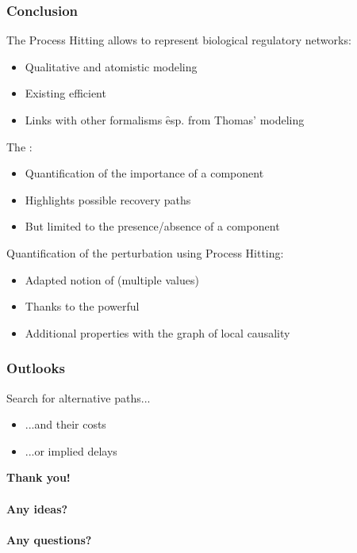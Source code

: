 
\begin{frame}[c]
  \frametitle{Conclusion}

The Process Hitting allows to represent biological regulatory networks:
\begin{itemize}
  \item Qualitative and atomistic modeling
  \item Existing efficient 
  \item Links with other formalisms \f esp. from Thomas' modeling
\end{itemize}

\medskip
The :
\begin{itemize}
  \item Quantification of the importance of a component
  \item Highlights possible recovery paths
  \item But limited to the presence/absence of a component
\end{itemize}

\medskip
Quantification of the perturbation using Process Hitting:
\begin{itemize}
  \item Adapted notion of  (multiple values)
  \item Thanks to the powerful 
  \item Additional properties with the graph of local causality
\end{itemize}
\end{frame}



\begin{frame}[c]
  \frametitle{Outlooks}

Search for alternative paths...
\begin{itemize}
  \item ...and their costs
  \item ...or implied delays
\end{itemize}

\pause
\vspace*{2cm}
\raggedleft
\Large
\bfseries
Thank you!\qquad~\\~\\
Any ideas?\qquad~\\~\\
Any questions?\qquad~\\

\end{frame}

